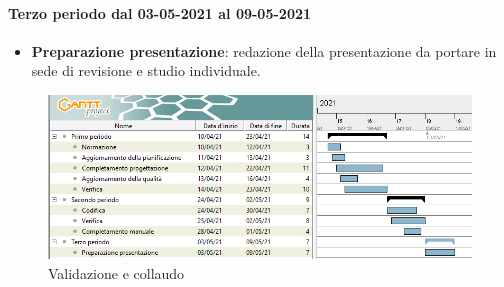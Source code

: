 	\paragraph{Terzo periodo dal 03-05-2021 al 09-05-2021}
	\begin{itemize}
		\item \textbf{Preparazione presentazione}: redazione della presentazione da portare in sede di revisione e
		studio individuale.
	\end{itemize}
	
	\newpage
	\begin{landscape}
		\begin{figure}[h!]
			\includegraphics[width=24cm]{images/5_Validazione_e_collaudo.png}
			\caption{Validazione e collaudo}
		\end{figure}
	\end{landscape}
